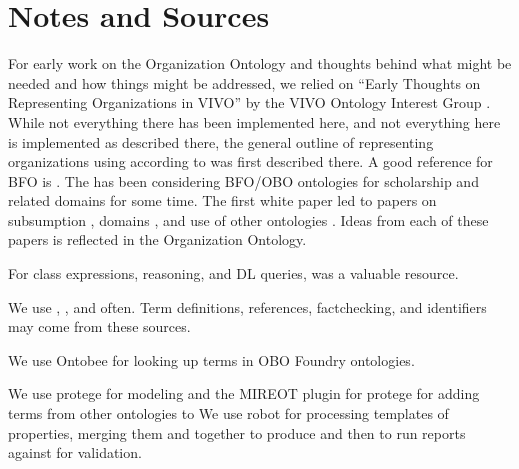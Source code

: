 \documentclass[letterpaper,10pt,english]{sphinxmanual}
\begin{document}
\chapter{Notes and Sources}
\label{\detokenize{notes-and-sources:notes-and-sources}}\label{\detokenize{notes-and-sources::doc}}
\sphinxAtStartPar
For early work on the Organization Ontology and thoughts behind what might be
needed and how things might be addressed, we relied on “Early Thoughts on
Representing Organizations in VIVO” by the VIVO Ontology Interest Group
.  While not everything there has been implemented here, and not
everything here is implemented as described there, the general outline of
representing organizations using  according to  was first described
there. A good reference for BFO is .  The  has been
considering BFO/OBO ontologies for scholarship and related domains for some
time. The first white paper  led to papers on subsumption ,
domains , and use of other ontologies .  Ideas from each of
these papers is reflected in the Organization Ontology.

\sphinxAtStartPar
For class expressions, reasoning, and DL queries,  was a valuable resource.

\sphinxAtStartPar
We use , , and  often.  Term definitions,
references, fact\sphinxhyphen{}checking, and identifiers may come from these sources.

\sphinxAtStartPar
We use Ontobee  for looking up terms in OBO Foundry ontologies.

\sphinxAtStartPar
We use protege  for modeling  and the MIREOT plug\sphinxhyphen{}in for
protege  for
adding terms from other ontologies to   We use robot  for
processing templates of properties, merging them and  together to
produce  and then to run reports against  for validation.
\end{document}
